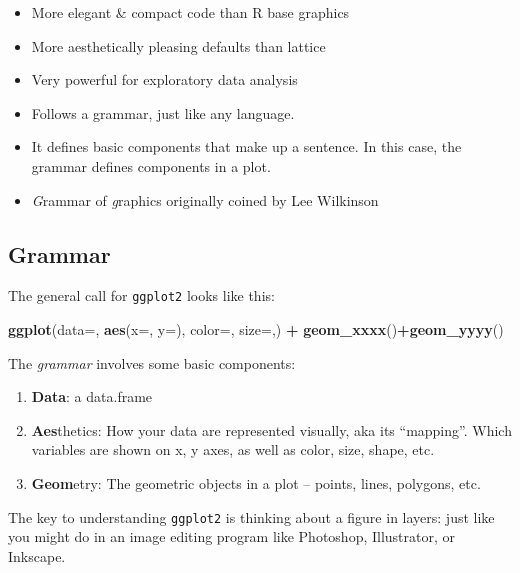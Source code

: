 \documentclass[]{book}
\newenvironment{Shaded}{\begin{snugshade}}{\end{snugshade}}
\newcommand{\KeywordTok}[1]{\textcolor[rgb]{0.13,0.29,0.53}{\textbf{#1}}}
\newcommand{\DataTypeTok}[1]{\textcolor[rgb]{0.13,0.29,0.53}{#1}}
\newcommand{\StringTok}[1]{\textcolor[rgb]{0.31,0.60,0.02}{#1}}
\newcommand{\OperatorTok}[1]{\textcolor[rgb]{0.81,0.36,0.00}{\textbf{#1}}}
\newcommand{\NormalTok}[1]{#1}
\providecommand{\tightlist}{%
  \setlength{\itemsep}{0pt}\setlength{\parskip}{0pt}}
\begin{document}
\begin{itemize}
\tightlist
\item
  More elegant \& compact code than R base graphics
\item
  More aesthetically pleasing defaults than lattice
\item
  Very powerful for exploratory data analysis
\item
  Follows a grammar, just like any language.
\item
  It defines basic components that make up a sentence. In this case, the
  grammar defines components in a plot.
\item
  \emph{G}rammar of \emph{g}raphics originally coined by Lee Wilkinson
\end{itemize}

\subsection{Grammar}\label{grammar}

The general call for \texttt{ggplot2} looks like this:

\begin{Shaded}
\begin{Highlighting}[]
\KeywordTok{ggplot}\NormalTok{(}\DataTypeTok{data=}\NormalTok{, }\KeywordTok{aes}\NormalTok{(}\DataTypeTok{x=}\NormalTok{, }\DataTypeTok{y=}\NormalTok{), }\DataTypeTok{color=}\NormalTok{, }\DataTypeTok{size=}\NormalTok{,) }\OperatorTok{+}\StringTok{ }\KeywordTok{geom_xxxx}\NormalTok{()}\OperatorTok{+}\KeywordTok{geom_yyyy}\NormalTok{()}
\end{Highlighting}
\end{Shaded}

The \emph{grammar} involves some basic components:

\begin{enumerate}
\def\labelenumi{\arabic{enumi}.}
\tightlist
\item
  \textbf{Data}: a data.frame
\item
  \textbf{Aes}thetics: How your data are represented visually, aka its
  ``mapping''. Which variables are shown on x, y axes, as well as color,
  size, shape, etc.
\item
  \textbf{Geom}etry: The geometric objects in a plot -- points, lines,
  polygons, etc.
\end{enumerate}

The key to understanding \texttt{ggplot2} is thinking about a figure in
layers: just like you might do in an image editing program like
Photoshop, Illustrator, or Inkscape.
\end{document}
